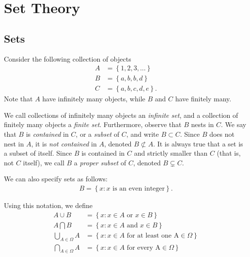 
\chapter{Set Theory}
\section{Sets}
Consider the following collection of objects
\begin{equation*}
\begin{split}
	A & = \left\{ 1,2,3,\ldots \right\} \\
	B &= \left\{ a, b, b, d \right\} \\
	C & = \left\{ a,b,c,d,e \right\}.
\end{split}
\end{equation*}
Note that $A$ have infinitely many objects, while $B$ and $C$ have finitely
many. 
\begin{definition}
We call collections of infinitely many objects an \emph{infinite set},
and a collection of finitely many objects a \emph{finite set}. 
Furthermore, observe that $B$ nests in $C$. We say that $B$ is
\emph{contained} in $C$, or a \emph{subset} of $C$, and write
$B \subset C$. Since $B$ does not nest in $A$, it is \emph{not contained} in
$A$, denoted $B \not \subset A$. It is always true that a set is a subset of
itself. Since $B$ is
contained in $C$ and strictly smaller
than $C$ (that is, not $C$ itself), we call $B$ a \emph{proper subset} of $C$, denoted $B \subsetneq C$.
\end{definition}
We can also specify sets as follows:
\begin{equation*}
\begin{split}
	B = \left\{ x: x \text{ is an even integer} \right\}.
\end{split}
\end{equation*}
\begin{notation}
Using this notation, we define
\begin{equation*}
\begin{split}
	A \cup B & = \left\{ x: x \in A \text{ or } x \in B \right\} \\
  A \bigcap B & = \left\{ x: x \in A \text{ and } x \in B \right\} \\
	\bigcup_{A \in \Omega} A & = \left\{ x: x \in A \text{ for at least one A} \in \Omega
	\right\} \\
\bigcap_{A \in \Omega} A & = \left\{ x: x \in A \text{ for every A} \in \Omega \right\}
\end{split}
\end{equation*}
\end{notation}
